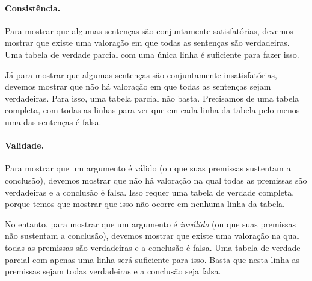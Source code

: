 \paragraph{Consistência.}
Para mostrar que algumas sentenças são conjuntamente satisfatórias, devemos mostrar que existe uma valoração em que todas as sentenças são verdadeiras.
Uma tabela de verdade parcial com uma única linha é suficiente para fazer isso.

Já para mostrar que algumas sentenças são conjuntamente insatisfatórias, devemos mostrar que não há valoração em que todas as sentenças sejam verdadeiras. 
Para isso, uma tabela parcial não basta. Precisamos de uma tabela completa, com todas as linhas para ver que em cada linha da tabela pelo menos uma das sentenças é falsa.

\paragraph{Validade.}
Para mostrar que um argumento é válido (ou que suas premissas sustentam a conclusão), devemos mostrar que não há valoração na qual todas as premissas são verdadeiras e a conclusão é falsa.
Isso requer uma tabela de verdade completa, porque temos que mostrar que isso não ocorre em nenhuma linha da tabela.

No entanto, para mostrar que um argumento é \emph{inválido} (ou que suas premissas não sustentam a conclusão), devemos mostrar que existe uma valoração na qual todas as premissas são verdadeiras e a conclusão é falsa.
Uma tabela de verdade parcial com apenas uma linha será suficiente para isso.
Basta que nesta linha as premissas sejam todas verdadeiras e a conclusão seja falsa.

